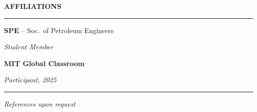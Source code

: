\documentclass[10pt,a4paper]{article}
\newcommand{\sideSection}[1]{%
  \vspace{5pt}%
  {\bfseries\color{sidetext}\small\MakeUppercase{#1}}%
  \par\vspace{1pt}%
  {\color{goldrule}\rule{\linewidth}{0.55pt}}%
  \par\vspace{2pt}%
}
\begin{document}
\begin{minipage}[t]{0.283\paperwidth}
\begin{minipage}[t]{\dimexpr\linewidth-18pt}
    \sideSection{Affiliations}
    {\small
      \textbf{\color{white}SPE} \color{sidetext}-- Soc.\ of Petroleum Engineers\par
      \textit{\color{goldrule!80}Student Member}\par\vspace{2pt}
      \textbf{\color{white}MIT Global Classroom}\par
      \textit{\color{goldrule!80}Participant, 2025}\par
    }

    \vspace{4pt}
    \begin{center}
      {\color{goldrule}\rule{0.55\linewidth}{0.4pt}}\par\vspace{2pt}
      {\color{sidetext!60}\small\itshape References upon request}
    \end{center}

  \end{minipage}
\end{minipage}%
%
\hspace*{10pt}%
\end{document}
